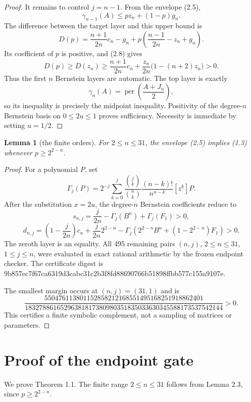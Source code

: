 \documentclass[11pt]{article}
\newtheorem{lemma}[theorem]{Lemma}
\begin{document}
\begin{proof}
It remains to control $j=n-1$.  From the envelope (2.5),
\[
\gamma_{n-1}(A)\le pz_n+(1-p)g_n.
\]
The difference between the target layer and this upper bound is
\[
D(p)=\frac{n+1}{2n}c_n-g_n
+p\left(\frac{n-1}{2n}-z_n+g_n\right).
\]
Its coefficient of $p$ is positive, and (2.8) gives
\[
D(p)\ge D(z_n)\ge
\frac{n+1}{2n}c_n+\frac{z_n}{2n}\bigl(1-(n+2)z_n\bigr)>0.
\]
Thus the first $n$ Bernstein layers are automatic.  The top layer is exactly
\[
\gamma_n(A)=\operatorname{per}\left(\frac{A+J_n}{2}\right),
\]
so its inequality is precisely the midpoint inequality.  Positivity of the
degree-$n$ Bernstein basis on $0\le2u\le1$ proves sufficiency.
Necessity is immediate by setting $u=1/2$.
\end{proof}


\Needspace{0.18\textheight}
\begin{lemma}[the finite orders]

For $2\le n\le31$, the envelope (2.5) implies (1.3) whenever
$p\ge2^{2-n}$.

\end{lemma}

\begin{proof}


For a polynomial $P$, set
\[
\Gamma_j(P)=2^{-j}\sum_{k=0}^j
\frac{\binom jk}{\binom nk}\frac{(n-k)!}{n^{n-k}}[z^k]P. \tag{2.9}
\]
After the substitution $x=2u$, the degree-$n$ Bernstein coefficients
reduce to
\[
s_{n,j}=\frac{j}{2n}-\Gamma_j(B^n)+\Gamma_j(F_1)>0, \tag{2.10}
\]
\[
d_{n,j}=\left(1-\frac{j}{2n}\right)c_n
+\frac{j}{2n}2^{2-n}
-\Gamma_j\!\left(2^{2-n}B^n+(1-2^{2-n})F_1\right)>0. \tag{2.11}
\]
The zeroth layer is an equality.  All 495 remaining pairs
$(n,j)$, $2\le n\le31$, $1\le j\le n$, were evaluated in exact
rational arithmetic by the frozen endpoint checker.  The certificate digest is
9b857ec7f67ca6319d3cabc31c2b3f8fd88690766b51898ffbb577c155a9107e.

The smallest margin occurs at $(n,j)=(31,1)$ and is
\[
\frac{550476113801152858212168551495168251918862401}
{18327886165296381817380980351835033630345588173537542144}>0.
\]
This certifies a finite symbolic complement, not a sampling of matrices or
parameters.
\end{proof}


\section{Proof of the endpoint gate}


We prove Theorem 1.1.  The finite range $2\le n\le31$ follows from
Lemma 2.3, since $p\ge2^{2-n}$.
\end{document}
